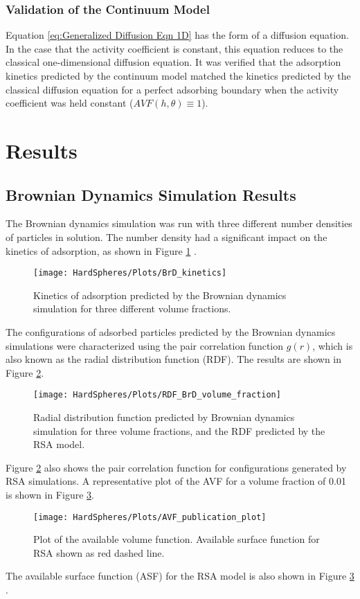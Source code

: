 \subsubsection{Validation of the Continuum Model}

Equation \ref{eq:Generalized Diffusion Eqn 1D} has the form of a
diffusion equation. In the case that the activity coefficient is constant,
this equation reduces to the classical one-dimensional diffusion equation.
It was verified that the adsorption kinetics predicted by the continuum
model matched the kinetics predicted by the classical diffusion equation
for a perfect adsorbing boundary when the activity coefficient was
held constant ($AVF\left(h,\theta\right)\equiv1$). 


\section*{Results}


\subsection{Brownian Dynamics Simulation Results}

The Brownian dynamics simulation was run with three different number
densities of particles in solution. The number density had a significant
impact on the kinetics of adsorption, as shown in Figure \ref{fig:BrD Adsorption Kinetics}
.%
\begin{figure}
\texttt{[image: HardSpheres/Plots/BrD\_kinetics]}\caption{\label{fig:BrD Adsorption Kinetics}Kinetics of adsorption predicted
by the Brownian dynamics simulation for three different volume fractions.}


%
\end{figure}
 The configurations of adsorbed particles predicted by the Brownian
dynamics simulations were characterized using the pair correlation
function $g\left(r\right)$, which is also known as the radial distribution
function (RDF). The results are shown in Figure \ref{fig:Brownian Dynamics RDF}.
%
\begin{figure}
\texttt{[image: HardSpheres/Plots/RDF\_BrD\_volume\_fraction]}\caption{\label{fig:Brownian Dynamics RDF}Radial distribution function predicted
by Brownian dynamics simulation for three volume fractions, and the
RDF predicted by the RSA model.}
%
\end{figure}
 Figure \ref{fig:Brownian Dynamics RDF} also shows the pair correlation
function for configurations generated by RSA simulations. A representative
plot of the AVF for a volume fraction of 0.01 is shown in Figure \ref{fig:Available Volume Function}.%
\begin{figure}[H]
\texttt{[image: HardSpheres/Plots/AVF\_publication\_plot]}

\caption{\label{fig:Available Volume Function}Plot of the available volume
function. Available surface function for RSA shown as red dashed line.}
%
\end{figure}
 The available surface function (ASF) for the RSA model is also shown
in Figure \ref{fig:Available Volume Function} \cite{Schaaf1989}. 



